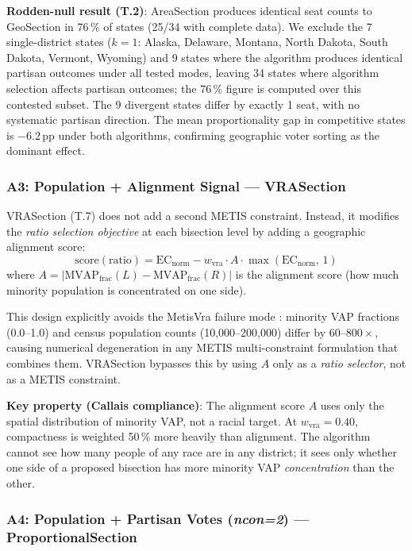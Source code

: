 \textbf{Rodden-null result (T.2)}: AreaSection produces identical seat counts to
GeoSection in 76\,\% of states (25/34 with complete data).
We exclude the 7 single-district states ($k=1$: Alaska, Delaware, Montana,
North Dakota, South Dakota, Vermont, Wyoming) and 9 states where the algorithm
produces identical partisan outcomes under all tested modes, leaving 34 states
where algorithm selection affects partisan outcomes; the 76\,\% figure is
computed over this contested subset.
The 9 divergent states differ by exactly 1 seat, with no systematic partisan direction.
The mean proportionality gap in competitive states is $-6.2$\,pp under both
algorithms, confirming geographic voter sorting as the dominant effect.

\subsubsection*{A3: Population + Alignment Signal --- VRASection}

VRASection (T.7) does not add a second METIS constraint.
Instead, it modifies the \emph{ratio selection objective} at each bisection level
by adding a geographic alignment score:
\[
  \text{score}(\text{ratio}) = \mathrm{EC}_\text{norm} - w_\text{vra}
  \cdot A \cdot \max(\mathrm{EC}_\text{norm},\, 1)
\]
where $A = |\text{MVAP}_\text{frac}(L) - \text{MVAP}_\text{frac}(R)|$
is the alignment score (how much minority population is concentrated on one side).

This design explicitly avoids the MetisVra failure mode \citep{b3paper}:
minority VAP fractions (0.0--1.0) and census population counts (10,000--200,000)
differ by $60$--$800\times$, causing numerical degeneration in any METIS
multi-constraint formulation that combines them.
VRASection bypasses this by using $A$ only as a \emph{ratio selector}, not as
a METIS constraint.

\textbf{Key property (Callais compliance)}: The alignment score $A$ uses only
the spatial distribution of minority VAP, not a racial target.
At $w_\text{vra} = 0.40$, compactness is weighted 50\,\% more heavily than
alignment.
The algorithm cannot see how many people of any race are in any district;
it sees only whether one side of a proposed bisection has more minority VAP
\emph{concentration} than the other.

\subsubsection*{A4: Population + Partisan Votes (\textit{ncon=2}) --- ProportionalSection}

